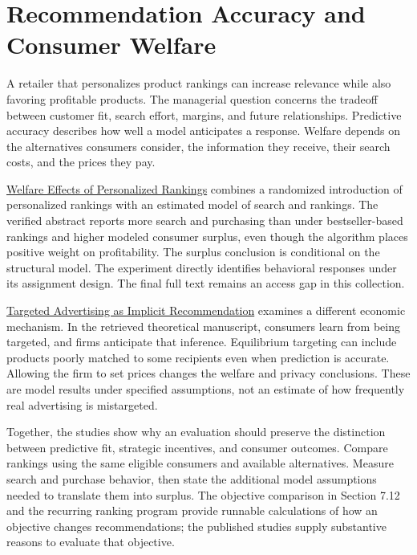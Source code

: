 \hypertarget{M07-recommendation-accuracy-and-consumer-welfare}{%
\section{Recommendation Accuracy and Consumer
Welfare}\label{M07-recommendation-accuracy-and-consumer-welfare}}

\noindent \noindent A retailer that personalizes product rankings can increase
relevance while also favoring profitable products. The managerial
question concerns the tradeoff between customer fit, search effort,
margins, and future relationships. Predictive accuracy describes how
well a model anticipates a response. Welfare depends on the alternatives
consumers consider, the information they receive, their search costs,
and the prices they pay.

\href{https://doi.org/10.1287/mksc.2023.1441}{Welfare Effects of
Personalized Rankings} combines a randomized introduction of
personalized rankings with an estimated model of search and rankings.
The verified abstract reports more search and purchasing than under
bestseller-based rankings and higher modeled consumer surplus, even
though the algorithm places positive weight on profitability. The
surplus conclusion is conditional on the structural model. The
experiment directly identifies behavioral responses under its assignment
design. The final full text remains an access gap in this collection.

\href{https://doi.org/10.1287/mksc.2023.0117}{Targeted Advertising as
Implicit Recommendation} examines a different economic mechanism. In the
retrieved theoretical manuscript, consumers learn from being targeted,
and firms anticipate that inference. Equilibrium targeting can include
products poorly matched to some recipients even when prediction is
accurate. Allowing the firm to set prices changes the welfare and
privacy conclusions. These are model results under specified
assumptions, not an estimate of how frequently real advertising is
mistargeted.

Together, the studies show why an evaluation should preserve the
distinction between predictive fit, strategic incentives, and consumer
outcomes. Compare rankings using the same eligible consumers and
available alternatives. Measure search and purchase behavior, then state
the additional model assumptions needed to translate them into surplus.
The objective comparison in Section 7.12 and the recurring ranking
program provide runnable calculations of how an objective changes
recommendations; the published studies supply substantive reasons to
evaluate that objective.

